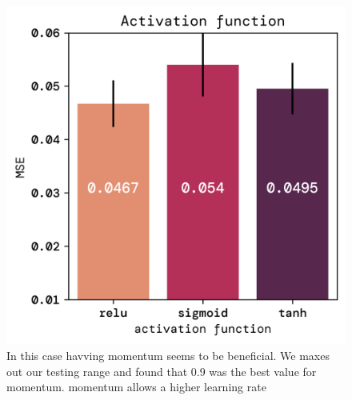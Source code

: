 \documentclass[twoside,11pt]{report}
\begin{document}
    \begin{figure}[!ht]
        \begin{minipage}[t]{0.5\textwidth - 1mm}
            \begin{center}
                \includegraphics[width=\textwidth]{../runsAndFigures/MSE_activs.png}
            \end{center}
            \caption{In this case havving momentum seems to be beneficial.
            We maxes out our testing range and found that 0.9 was the best value for momentum. 
            momentum allows a higher learning rate}\label{fig:accuracy_optimizer}
        \end{minipage}
        \hspace{2mm}
        \begin{minipage}[t]{0.5\textwidth - 1mm}
            \begin{center}

\end{center}
\end{minipage}
\end{figure}
\end{document}
